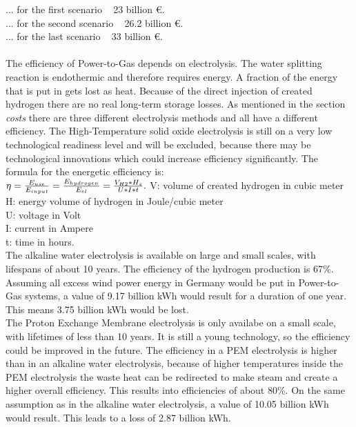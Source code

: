 \begin{parcolumns}[colwidths={1=2.5 cm, 2=10 cm, 3=2.5 cm}]{3}
{... for the first scenario ~ 23 billion \euro .\\
... for the second scenario ~ 26.2 billion \euro .\\
... for the last scenario ~ 33 billion \euro . \\
 \\
The efficiency of Power-to-Gas depends on electrolysis. The water splitting reaction is endothermic and therefore requires energy. A fraction of the energy that is put in gets lost as heat. Because of the direct injection of created hydrogen there are no real long-term storage losses. As mentioned in the section \textit{costs} there are three different electrolysis methods and all have a different efficiency. The High-Temperature solid oxide electrolysis is still on a very low technological readiness level and will be excluded, because there may be technological innovations which could increase efficiency significantly. The formula for the energetic efficiency is: \\
\begin{math}
\eta = \frac{E_{use}}{E_{input}} = \frac{E_{hydrogen}}{E_{el}} = \frac{V_{H2}* H_{s}}{U*I*t}. \\
\end{math}
V: volume of created hydrogen in cubic meter\\
H: energy volume of hydrogen in Joule/cubic meter\\
U: voltage in Volt\\
I: current in Ampere\\
t: time in hours. 
\\
The alkaline water electrolysis is available on large and small scales, with lifespans of about 10 years. The efficiency of the hydrogen production is 67\%. Assuming all excess wind power energy in Germany would be put in Power-to-Gas systems, a value of 9.17 billion kWh would result for a duration of one year. This means 3.75 billion kWh would be lost. 
\\
The Proton Exchange Membrane electrolysis is only availabe on a small scale, with lifetimes of less than 10 years. It is still a young technology, so the efficiency could be improved in the future. The efficiency in a PEM electrolysis is higher than in an alkaline water electrolysis, because of higher temperatures inside the PEM electrolysis the waste heat can be redirected to make steam and create a higher overall efficiency. This results into efficiencies of about 80\%. On the same assumption as in the alkaline water electrolysis, a value of 10.05 billion kWh would result. This leads to a loss of 2.87 billion kWh. 
}
\end{parcolumns}
